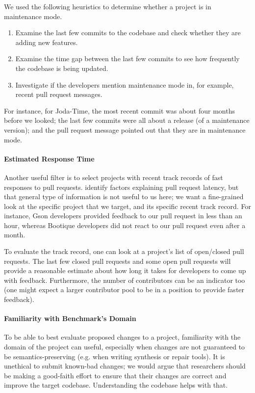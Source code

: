 We used the following heuristics to determine whether a project is in maintenance mode.
\begin{enumerate}
  \item Examine the last few commits to the codebase and check whether they are adding new features.
  \item Examine the time gap between the last few commits to see how frequently the codebase is being updated.
  \item Investigate if the developers mention maintenance mode in, for example, recent pull request messages.
\end{enumerate}

For instance, for Joda-Time, the most recent commit was about four months before we looked; the last few commits were all about a release (of a maintenance version); and the pull request message pointed out that they are in maintenance mode.

\paragraph{Estimated Response Time}
Another useful filter is to select projects with recent track records of fast responses to pull requests.  identify factors explaining pull request latency, but that general type of information is not useful to us here; we want a fine-grained look at the specific project that we target, and its specific recent track record. For instance, Gson developers provided feedback to our pull request in less than an hour, whereas Bootique developers did not react to our pull request even after a month.

To evaluate the track record, one can look at a project's list of open/closed pull requests. The last few closed pull requests and some open pull requests will provide a reasonable estimate about how long it takes for developers to come up with feedback. Furthermore, the number of contributors can be an indicator too (one might expect a larger contributor pool to be in a position to provide faster feedback).

\paragraph{Familiarity with Benchmark's Domain}
To be able to best evaluate proposed changes to a project, familiarity with the domain of the project can useful, especially when changes are not guaranteed to be semantics-preserving (e.g. when writing synthesis or repair tools). It is unethical to submit known-bad changes; we would argue that researchers should be making a good-faith effort to ensure that their changes are correct and improve the target codebase. Understanding the codebase helps with that.

